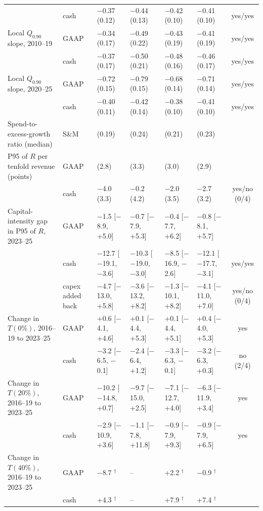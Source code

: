 \begin{table}[p]
\begin{tabular}{@{}>{\raggedright\arraybackslash}p{3.9cm}l>{\centering\arraybackslash}p{1.9cm}>{\centering\arraybackslash}p{1.9cm}>{\centering\arraybackslash}p{1.9cm}>{\centering\arraybackslash}p{1.9cm}c@{}}
 & cash & $-$0.37 (0.12) & $-$0.44 (0.13) & $-$0.42 (0.10) & $-$0.41 (0.10) & yes/yes \\
Local $Q_{0.90}$ slope, 2010--19 & GAAP & $-$0.34 (0.17) & $-$0.49 (0.22) & $-$0.43 (0.19) & $-$0.41 (0.19) & yes/yes \\
 & cash & $-$0.37 (0.17) & $-$0.50 (0.21) & $-$0.48 (0.16) & $-$0.46 (0.17) & yes/yes \\
Local $Q_{0.90}$ slope, 2020--25 & GAAP & $-$0.72 (0.15) & $-$0.79 (0.15) & $-$0.68 (0.14) & $-$0.71 (0.14) & yes/yes \\
 & cash & $-$0.40 (0.11) & $-$0.42 (0.14) & $-$0.38 (0.10) & $-$0.41 (0.10) & yes/yes \\
Spend-to-excess-growth ratio (median) & S\&M & 3.07 (0.19) & 3.51 (0.24) & 3.42 (0.21) & 3.29 (0.23) &  \\
P95 of $R$ per tenfold revenue (points) & GAAP & 2.7 (2.8) & 4.2 (3.3) & 3.8 (3.0) & 3.2 (2.9) &  \\
 & cash & $-$4.0 (3.3) & $-$0.2 (4.2) & $-$2.0 (3.5) & $-$2.7 (3.2) & yes/no (0/4) \\
Capital-intensity gap in P95 of $R$, 2023--25 & GAAP & $-$1.5 [$-$8.9, +5.0] & $-$0.7 [$-$7.9, +5.3] & $-$0.4 [$-$7.7, +6.2] & $-$0.8 [$-$8.1, +5.7] &  \\
 & cash & $-$12.7 [$-$19.1, $-$3.6] & $-$10.3 [$-$19.0, $-$3.0] & $-$8.5 [$-$16.9, $-$2.6] & $-$12.1 [$-$17.7, $-$3.1] & yes/yes \\
 & capex added back & $-$4.7 [$-$13.0, +5.8] & $-$3.6 [$-$13.2, +8.2] & $-$1.3 [$-$10.1, +8.2] & $-$4.1 [$-$11.0, +7.0] & yes/no (0/4) \\
Change in $T(0\%)$, 2016--19 to 2023--25 & GAAP & +0.6 [$-$4.1, +4.6] & +0.1 [$-$4.4, +5.3] & +0.1 [$-$4.4, +5.1] & +0.4 [$-$4.0, +5.3] & yes \\
 & cash & $-$3.2 [$-$6.5, $-$0.1] & $-$2.4 [$-$6.4, +1.2] & $-$3.3 [$-$6.3, $-$0.1] & $-$3.2 [$-$6.3, +0.3] & no (2/4) \\
Change in $T(20\%)$, 2016--19 to 2023--25 & GAAP & $-$10.2 [$-$14.8, +0.7] & $-$9.7 [$-$15.0, +2.5] & $-$7.1 [$-$12.7, +4.0] & $-$6.3 [$-$11.9, +3.4] & yes \\
 & cash & $-$2.9 [$-$10.9, +3.6] & $-$1.1 [$-$7.8, +11.8] & $-$0.9 [$-$7.9, +9.3] & $-$0.9 [$-$7.9, +6.5] & yes \\
Change in $T(40\%)$, 2016--19 to 2023--25 & GAAP & $-$8.7 $^\dagger$ & -- & +2.2 $^\dagger$ & $-$0.9 $^\dagger$ &  \\
 & cash & +4.3 $^\dagger$ & -- & +7.9 $^\dagger$ & +7.4 $^\dagger$ &  \\

\end{tabular}
\end{table}
